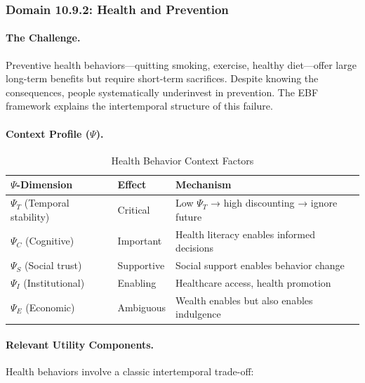 \subsubsection{Domain 10.9.2: Health and Prevention}
\label{subsubsec:health-prevention}

\paragraph{The Challenge.}
Preventive health behaviors---quitting smoking, exercise, healthy diet---offer
large long-term benefits but require short-term sacrifices. Despite knowing
the consequences, people systematically underinvest in prevention. The EBF
framework explains the intertemporal structure of this failure.

\paragraph{Context Profile ($\Psi$).}

\begin{table}[htbp]
\centering
\caption{Health Behavior Context Factors}
\label{tab:health-psi}
\renewcommand{\arraystretch}{1.3}
\begin{tabular}{@{}lll@{}}
\toprule
\textbf{$\Psi$-Dimension} & \textbf{Effect} & \textbf{Mechanism} \\
\midrule
$\Psi_T$ (Temporal stability) & Critical & Low $\Psi_T$ → high discounting → ignore future \\
$\Psi_C$ (Cognitive) & Important & Health literacy enables informed decisions \\
$\Psi_S$ (Social trust) & Supportive & Social support enables behavior change \\
$\Psi_I$ (Institutional) & Enabling & Healthcare access, health promotion \\
$\Psi_E$ (Economic) & Ambiguous & Wealth enables but also enables indulgence \\
\bottomrule
\end{tabular}
\end{table}

\paragraph{Relevant Utility Components.}
Health behaviors involve a classic intertemporal trade-off:

